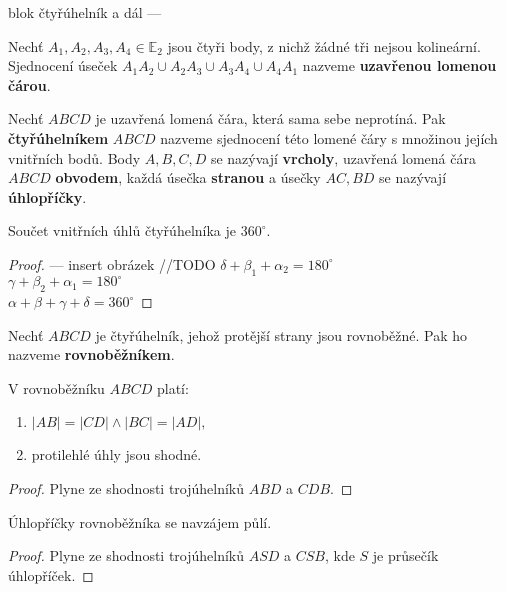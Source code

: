 blok čtyřúhelník a dál ---
\begin{definition}
  Nechť $A_1,A_2, A_3, A_4 \in \mathbb E_2$ jsou čtyři body, z nichž žádné tři nejsou kolineární. Sjednocení úseček $A_1A_2\cup A_2A_3 \cup A_3A_4 \cup A_4A_1$ nazveme \textbf{uzavřenou lomenou čárou}.
\end{definition}

\begin{definition}
  Nechť $ABCD$ je uzavřená lomená čára, která sama sebe neprotíná. Pak \textbf{čtyřúhelníkem} $ABCD$ nazveme sjednocení této lomené čáry s množinou jejích vnitřních bodů. Body $A,B,C,D$ se nazývají \textbf{vrcholy}, uzavřená lomená čára $ABCD$ \textbf{obvodem}, každá úsečka \textbf{stranou} a úsečky $AC,BD$ se nazývají \textbf{úhlopříčky}.
\end{definition}

\begin{veta}
  Součet vnitřních úhlů čtyřúhelníka je $360^\circ$.
\end{veta}

\begin{proof}
  --- insert obrázek //TODO %
  $\delta+ \beta_1+ \alpha_2 = 180^\circ$\\
  $\gamma + \beta_2 + \alpha_1 = 180^\circ$\\
  $\alpha+\beta+\gamma+\delta=360^\circ$
\end{proof}

\begin{definition}
  Nechť $ABCD$ je čtyřúhelník, jehož protější strany jsou rovnoběžné. Pak ho nazveme \textbf{rovnoběžníkem}.
\end{definition}

\begin{veta}
  V rovnoběžníku $ABCD$ platí:
  \begin{enumerate}[$i.$]
    \item $|AB|=|CD| \land |BC|=|AD|,$
    \item protilehlé úhly jsou shodné.
  \end{enumerate}
\end{veta}

\begin{proof}
  Plyne ze shodnosti trojúhelníků $ABD$ a $CDB.$
\end{proof}

\begin{veta}
  Úhlopříčky rovnoběžníka se navzájem půlí.
\end{veta}


\begin{proof}
  Plyne ze shodnosti trojúhelníků $ASD$ a $CSB$, kde $S$ je průsečík úhlopříček.
\end{proof}

